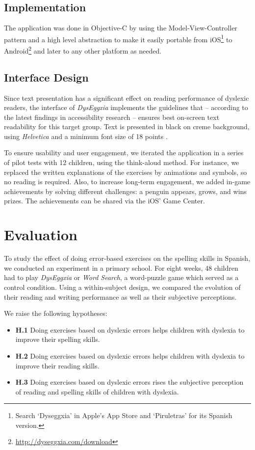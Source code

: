 \documentclass[letterpaper]{sig-alternate-2013}
\begin{document}
\subsection{Implementation}
\sloppy
The application was done in Objective-C by using the Model-View-Controller pattern and a high level abstraction to make it easily portable from iOS\footnote{Search `Dyseggxia' in Apple's App Store and `Piruletras' for its Spanish version.}
to Android\footnote{\small{\url{http://dyseggxia.com/download}}} and later to any other platform as needed. 

\subsection{Interface Design}
Since text presentation has a significant effect on reading performance of dyslexic readers, the interface of {\it DysEggxia} implements the guidelines that -- according to the latest findings in accessibility research \cite{Gregor2000,Kurniawan2006,W4A2012} -- ensures best on-screen text readability for this target group. Text is presented in black on creme background, using \emph{Helvetica}  \cite{ASSETS2013} and a minimum font size of 18 points \cite{W4A2013Wiki}.

To ensure usability and user engagement, we iterated the application in a series of pilot tests with 12 children, using the think-aloud method. For instance, we replaced the written explanations of the exercises by animations and symbols, so no reading is required. Also, to increase long-term engagement, we added in-game achievements by solving different challenges: a penguin appears, grows, and wins prizes. The achievements can be shared via the iOS' Game Center. 

  


  

\section{Evaluation}
To study the effect of doing error-based exercises on the spelling skills in Spanish, we conducted an experiment in a primary school. For eight weeks, 48 children had to play {\it DysEggxia} or {\it Word Search}, a word-puzzle game which served as a control condition. Using a within-subject design, we compared the evolution of their reading and writing performance as well as their subjective perceptions. 

We raise the following hypotheses:
\begin{itemize}
	\item \textbf{H.1} Doing exercises based on dyslexic errors helps children with dyslexia to improve their spelling skills.
	\item \textbf{H.2} Doing exercises based on dyslexic errors helps children with dyslexia to improve their reading skills.
	\item \textbf{H.3} Doing exercises based on dyslexic errors rises the subjective perception of reading and spelling skills of children with dyslexia. 
\end{itemize}
\end{document}
